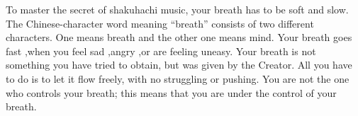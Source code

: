 ﻿To master the secret of shakuhachi music, your breath has to be soft and slow.
The Chinese-character word meaning “breath” consists of two different characters.
One means breath and the other one means mind.
Your breath goes fast ,when you feel sad ,angry ,or are feeling uneasy.
Your breath is not something you have tried to obtain, but was given by the Creator.
All you have to do is to let it flow freely, with no struggling or pushing.
You are not the one who controls your breath; this means that you are under the control of your breath.


